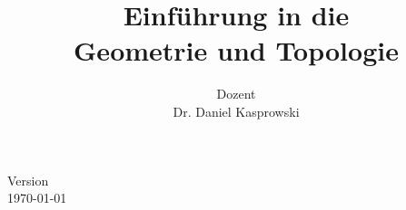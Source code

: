 \documentclass[a4paper,german]{article}
\title{{Einführung in die} \\ Geometrie und Topologie}
\author{{\normalfont Dozent}\\{\sc Dr. Daniel Kasprowski}}
\begin{document}
    \maketitle
    \vspace{3em}
    \centering \small Version \\
    \today\; \currenttime
    \vspace{10em}
    
    \newpage
    \tableofcontents
    \newpage
    
    
    
    
    
    
    
    \printindex
\end{document}
